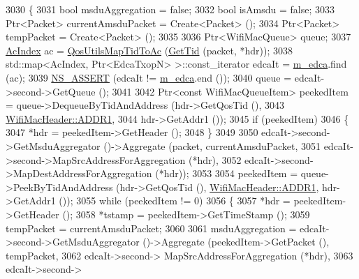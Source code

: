\begin{DoxyCode}
3030 \{
3031   \textcolor{keywordtype}{bool} msduAggregation = \textcolor{keyword}{false};
3032   \textcolor{keywordtype}{bool} isAmsdu = \textcolor{keyword}{false};
3033   Ptr<Packet> currentAmsduPacket = Create<Packet> ();
3034   Ptr<Packet> tempPacket = Create<Packet> ();
3035 
3036   Ptr<WifiMacQueue> queue;
3037   \hyperlink{group__wifi_gab422b4562ba272b39a9b6bca3513f3ac}{AcIndex} ac = \hyperlink{group__wifi_ga4e36efcff6dd83eaee42e1af0de43d48}{QosUtilsMapTidToAc} (\hyperlink{group__wifi_ga92cc18e2c5aa6bed3728860bbad76ff8}{GetTid} (packet, *hdr));
3038   std::map<AcIndex, Ptr<EdcaTxopN> >::const\_iterator edcaIt = \hyperlink{classns3_1_1MacLow_a754751ba4152c9337611a5f015045a44}{m\_edca}.find (ac);
3039   \hyperlink{assert_8h_a6dccdb0de9b252f60088ce281c49d052}{NS\_ASSERT} (edcaIt != \hyperlink{classns3_1_1MacLow_a754751ba4152c9337611a5f015045a44}{m\_edca}.end ());
3040   queue = edcaIt->second->GetQueue ();
3041 
3042   Ptr<const WifiMacQueueItem> peekedItem = queue->DequeueByTidAndAddress (hdr->GetQosTid (),
3043                                                                           
      \hyperlink{classns3_1_1WifiMacHeader_a17406db48973a8e8fb6d961dd35154fea8ff9765c77ab96f3bbc7385ece3d00bf}{WifiMacHeader::ADDR1},
3044                                                                           hdr->GetAddr1 ());
3045   \textcolor{keywordflow}{if} (peekedItem)
3046     \{
3047       *hdr = peekedItem->GetHeader ();
3048     \}
3049 
3050   edcaIt->second->GetMsduAggregator ()->Aggregate (packet, currentAmsduPacket,
3051                                                    edcaIt->second->MapSrcAddressForAggregation (*hdr),
3052                                                    edcaIt->second->MapDestAddressForAggregation (*hdr));
3053 
3054   peekedItem = queue->PeekByTidAndAddress (hdr->GetQosTid (), 
      \hyperlink{classns3_1_1WifiMacHeader_a17406db48973a8e8fb6d961dd35154fea8ff9765c77ab96f3bbc7385ece3d00bf}{WifiMacHeader::ADDR1}, hdr->GetAddr1 ());
3055   \textcolor{keywordflow}{while} (peekedItem != 0)
3056     \{
3057       *hdr = peekedItem->GetHeader ();
3058       *tstamp = peekedItem->GetTimeStamp ();
3059       tempPacket = currentAmsduPacket;
3060 
3061       msduAggregation = edcaIt->second->GetMsduAggregator ()->Aggregate (peekedItem->GetPacket (), 
      tempPacket,
3062                                                                          edcaIt->second->
      MapSrcAddressForAggregation (*hdr),
3063                                                                          edcaIt->second->

\end{DoxyCode}
